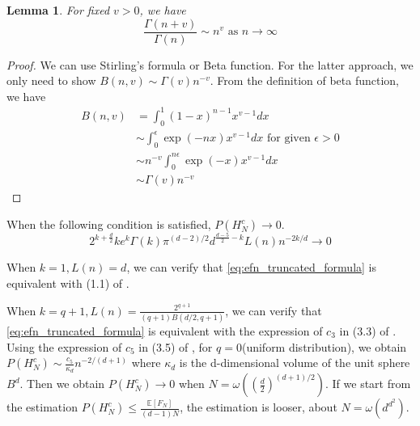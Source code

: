 \documentclass{article}
\newtheorem{lemma}{Lemma}
\def\E{\mathbb{E}}
\begin{document}
\begin{lemma}
    For fixed $v>0$, we have
    \begin{equation}
        \frac{\Gamma(n+v)}{\Gamma(n)} \sim
        n^v
        \textrm{ as } n \to \infty             
    \end{equation}
\end{lemma}
\begin{proof}
    We can use Stirling's formula or Beta function.
    For the latter approach, we only need to show
    $B(n, v) \sim \Gamma(v) n^{-v}$.
    From the definition of beta function,
    we have
    \begin{align*}
        B(n,v) &=\int_0^1 (1-x)^{n-1} x^{v-1} dx \\
        &\sim \int_0^{\epsilon} \exp(-nx) x^{v-1}dx \textrm{ for given } \epsilon>0\\
        & \sim n^{-v} \int_0^{n\epsilon} \exp(-x)x^{v-1}dx\\
        &\sim \Gamma(v) n^{-v}
    \end{align*}
\end{proof}
When the following condition is satisfied, $P(H_N^c) \to 0$.
\begin{equation}
2^{k+\frac{d}{2}} k e^k \Gamma(k) \pi^{(d-2)/2} d^{\frac{d-5}{2} -k} L(n) n^{-2k/d}  \to 0   
\end{equation}

When $k=1, L(n)=d$, we can verify that
\eqref{eq:efn_truncated_formula} is equivalent with (1.1)
of \cite{raynaud1970enveloppe}.

When $k=q+1, L(n)=\frac{2^{q+1}}{(q+1)B(d/2,q+1)}$,
we can verify that
\eqref{eq:efn_truncated_formula} is equivalent with the expression of $c_3$
in (3.3) of \cite{affentranger1991convex}.
Using the expression of $c_5$ in (3.5) of 
\cite{affentranger1991convex},
for $q=0$(uniform distribution),
we obtain $P(H_N^c)\sim \frac{c_5}{\kappa_d}
n^{-2/(d+1)}$ where $\kappa_d$ is the d-dimensional volume of
the unit sphere $B^d$. Then we obtain $P(H_N^c) \to 0$
when $N=\omega((\frac{d}{2})^{(d+1)/2})$. If we start from the estimation
$P(H_N^c) \leq \frac{\E[F_N]}{(d-1)N}$, the estimation is looser, about
$N=\omega(d^{d^2})$.



\end{document}
